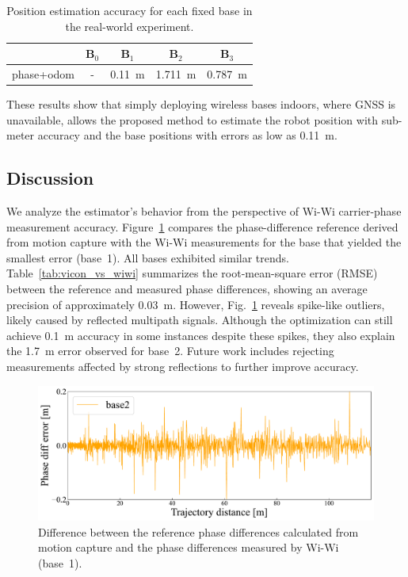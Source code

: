 \documentclass[conference]{IEEEtran}
\begin{document}
\begin{table}
    \centering
    \caption{Position estimation accuracy for each fixed base in the real-world experiment.}
    \begin{tabular}{ccccc}
    \toprule
    &$\mathbf{B}_0$& $\mathbf{B}_1$ & $\mathbf{B}_2$ & $\mathbf{B}_3$ \\
    \midrule
    phase+odom &-&0.11~m & 1.711~m & 0.787~m \\
    \bottomrule
    \end{tabular}
    \label{tab:base_error_real}
\end{table}

These results show that simply deploying wireless bases indoors, where GNSS is unavailable, allows the proposed method to estimate the robot position with sub-meter accuracy and the base positions with errors as low as 0.11~m.

\subsection{Discussion}
We analyze the estimator's behavior from the perspective of Wi-Wi carrier-phase measurement accuracy.
Figure~\ref{fig:vicon_vs_wiwi} compares the phase-difference reference derived from motion capture with the Wi-Wi measurements for the base that yielded the smallest error (base~1).
All bases exhibited similar trends.
Table~\ref{tab:vicon_vs_wiwi} summarizes the root-mean-square error (RMSE) between the reference and measured phase differences, showing an average precision of approximately 0.03~m.
However, Fig.~\ref{fig:vicon_vs_wiwi} reveals spike-like outliers, likely caused by reflected multipath signals.
Although the optimization can still achieve 0.1~m accuracy in some instances despite these spikes, they also explain the 1.7~m error observed for base~2.
Future work includes rejecting measurements affected by strong reflections to further improve accuracy.

\begin{figure}
    \centering
    \includegraphics[width=0.99\linewidth]{project/figures/icara_1018_resutl_2_online_distance_pdm2_differences.pdf}
    \caption{Difference between the reference phase differences calculated from motion capture and the phase differences measured by Wi-Wi (base~1).}
    \label{fig:vicon_vs_wiwi}
\end{figure}
\end{document}
